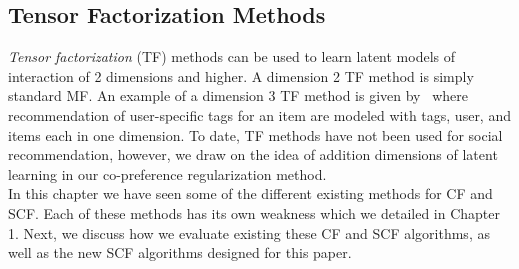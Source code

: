 \subsection{Tensor Factorization Methods}


\emph{Tensor factorization} (TF) methods can be used to learn latent
models of interaction of 2 dimensions and higher.  A dimension 2 TF
method is simply standard MF.  An example of a dimension 3 TF method
is given by~\cite{tf} where recommendation of user-specific tags for
an item are modeled with tags, user, and items each in one dimension.
To date, TF methods have not been used for social recommendation,
however, we draw on the idea of addition dimensions of latent learning
in our co-preference regularization method.
\\

In this chapter we have seen some of the different existing methods for CF and SCF. Each of these methods has its own weakness which we detailed in Chapter 1. Next, we discuss how we evaluate existing these CF and SCF algorithms, as well as the new SCF algorithms designed for this paper.